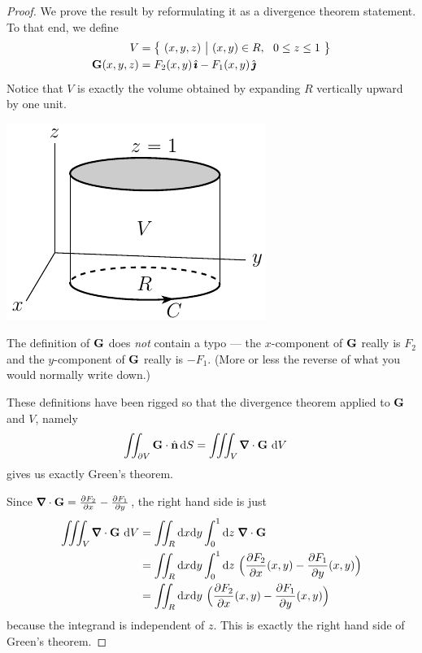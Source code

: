 \begin{proof}
We prove the result by reformulating it as a divergence theorem statement.
To that end, we define
\begin{align*}
V&=\big\{ \ (x,y,z)\ \big|\  (x,y)\in R,\ \ 0\le z\le 1\ \big\} \\
\mathbf{G}(x,y,z) &= F_2(x,y)\,\hat{\pmb{\imath}} -F_1(x,y)\,\hat{\pmb{\jmath}}
\end{align*}
Notice that $V$ is exactly the volume obtained by expanding $R$ vertically
upward by one unit.
 
\begin{nfig}
\begin{center}
    \includegraphics{greens2.pdf}
\end{center}
\end{nfig}
The definition of $\mathbf{G}$ does \emph{not} contain a typo --- the $x$-component
of $\mathbf{G}$ really is $F_2$ and the $y$-component of $\mathbf{G}$ really is $-F_1$.
(More or less the reverse of what you would normally write down.)

These definitions have been rigged so that the divergence theorem
applied to $\mathbf{G}$ and $V$, namely
\begin{align*}
\dblInt_{\partial V} \vG\cdot\hn\,\dee{S}
&=\tripInt_V\vnabla\cdot\vG\ \dee{V} 
\end{align*}
gives us exactly Green's theorem. 

Since $\vnabla\cdot\vG = \frac{\partial F_2}{\partial x} 
                - \frac{\partial F_1}{\partial y}$,  the right hand side is just
\begin{align*}
\tripInt_V\vnabla\cdot\vG\ \dee{V}
&= \dblInt_{R}\dee{x}\dee{y}\int_0^1\dee{z} \ \vnabla\cdot\vG \\
&= \dblInt_{R}\dee{x}\dee{y}\int_0^1\dee{z} \ 
        \Big(\frac{\partial F_2}{\partial x}(x,y) 
                - \frac{\partial F_1}{\partial y}(x,y)\Big) \\
&= \dblInt_{R}\dee{x}\dee{y}\
        \Big(\frac{\partial F_2}{\partial x}(x,y) 
                - \frac{\partial F_1}{\partial y}(x,y)\Big) 
\end{align*}
because the integrand is independent of $z$. This is exactly the right 
hand side of Green's theorem.


\end{proof}
